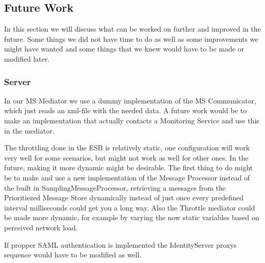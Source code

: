 \subsection{Future Work}\label{Future Work}
    In this section we will discuss what can be worked on further and improved in the future. Some things we did not have time to do as well as some improvements we might have wanted and some things that we knew would have to be made or modified later.
    
	\subsubsection{Server}\label{Future:Server}
    	In our MS Mediator we use a dummy implementation of the MS Communicator, which just reads an xml-file with the needed data. A future work would be to make an implementation that actually contacts a Monitoring Service and use this in the mediator.

    	The throttling done in the ESB is relatively static, one configuration will work very well for some scenarios, but might not work as well for other ones. In the future, making it more dynamic might be desirable. The first thing to do might be to make and use a new implementation of the Message Processor instead of the built in SamplingMessageProcessor, retrieving a messages from the Prioritiezed Message Store dynamically instead of just once every predefined interval milliseconds could get you a long way. Also the Throttle mediator could be made more dynamic, for example by varying the now static variables based on perceived network load.

		If propper SAML authentication is implemented the IdentityServer proxys sequence would have to be modified as well.
